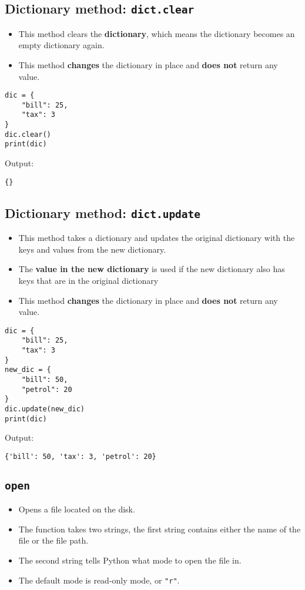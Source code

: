 \documentclass[11pt]{article}
\begin{document}
\subsection{Dictionary method: \texttt{dict.clear}}
\label{sec:org7db004f}
\begin{itemize}
\item This method clears the \textbf{dictionary}, which means the dictionary becomes an empty dictionary again.
\item This method \textbf{changes} the dictionary in place and \textbf{does not} return any value.
\end{itemize}
\begin{verbatim}
dic = {
    "bill": 25,
    "tax": 3
}
dic.clear()
print(dic)
\end{verbatim}

 \noindent Output:

\begin{verbatim}
{}
\end{verbatim}

\subsection{Dictionary method: \texttt{dict.update}}
\label{sec:org0d9745d}
\begin{itemize}
\item This method takes a dictionary and updates the original dictionary with the keys and values from the new dictionary.
\item The \textbf{value in the new dictionary} is used if the new dictionary also has keys that are in the original dictionary
\item This method \textbf{changes} the dictionary in place and \textbf{does not} return any value.
\end{itemize}
\begin{verbatim}
dic = {
    "bill": 25,
    "tax": 3
}
new_dic = {
    "bill": 50,
    "petrol": 20
}
dic.update(new_dic)
print(dic)
\end{verbatim}

 \noindent Output:

\begin{verbatim}
{'bill': 50, 'tax': 3, 'petrol': 20}
\end{verbatim}

\subsection{\texttt{open}}
\label{sec:org8aa991e}
\begin{itemize}
\item Opens a file located on the disk.
\item The function takes two strings, the first string contains either the name of the file or the file path.
\item The second string tells Python what mode to open the file in.
\item The default mode is read-only mode, or \texttt{"r"}.
\end{itemize}
\end{document}

